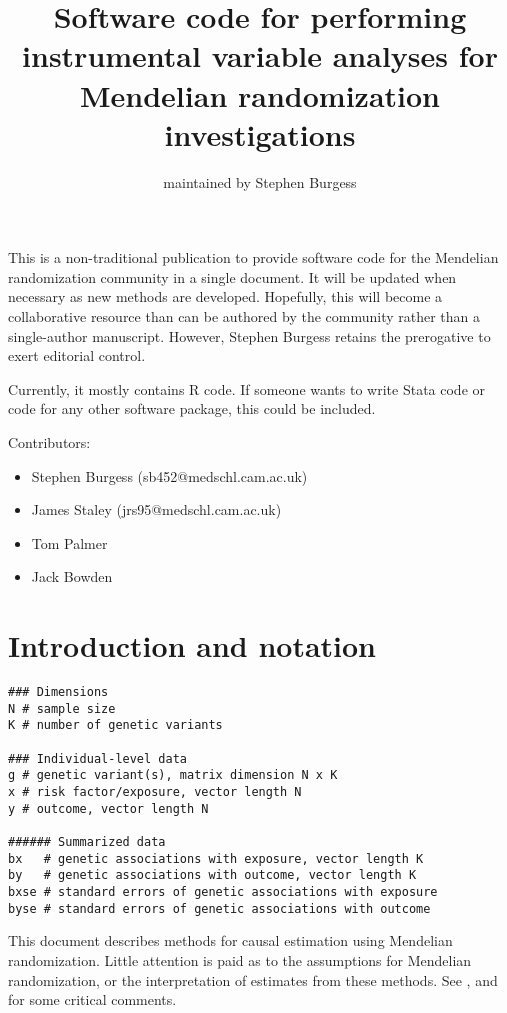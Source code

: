 \documentclass[a4paper,12pt]{article} %
\begin{document}
\title{Software code for performing instrumental variable analyses for Mendelian randomization investigations}
\author{maintained by Stephen Burgess}
\maketitle
This is a non-traditional publication to provide software code for the Mendelian randomization community in a single document. It will be updated when necessary as new methods are developed. Hopefully, this will become a collaborative resource than can be authored by the community rather than a single-author manuscript. However, Stephen Burgess retains the prerogative to exert editorial control.

Currently, it mostly contains R code. If someone wants to write Stata code or code for any other software package, this could be included.

Contributors:
\begin{itemize}
\item Stephen Burgess (sb452@medschl.cam.ac.uk)
\item James Staley (jrs95@medschl.cam.ac.uk)
\item Tom Palmer
\item Jack Bowden
\end{itemize}

\clearpage

\tableofcontents %

\clearpage

\section{Introduction and notation}
\begin{lstlisting}
### Dimensions
N # sample size
K # number of genetic variants

### Individual-level data
g # genetic variant(s), matrix dimension N x K
x # risk factor/exposure, vector length N
y # outcome, vector length N

###### Summarized data
bx   # genetic associations with exposure, vector length K
by   # genetic associations with outcome, vector length K
bxse # standard errors of genetic associations with exposure
byse # standard errors of genetic associations with outcome
\end{lstlisting}

This document describes methods for causal estimation using Mendelian randomization. Little attention is paid as to the assumptions for Mendelian randomization, or the interpretation of estimates from these methods. See \cite{hernan2006}, \cite{glymour2012} and \cite{vanderweele2014} for some critical comments.
\end{document}
